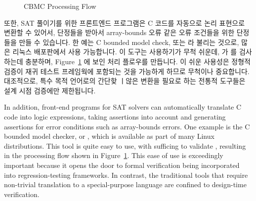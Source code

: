 \begin{figure}[tbp]
\centering
{}
\caption{CBMC Processing Flow}
\label{fig:formal:CBMC Processing Flow}
\end{figure}

또한, SAT 풀이기를 위한 프론트엔드 프로그램은 C 코드를 자동으로 논리 표현으로
변환할 수 있어서, 단정들을 받아서 array-bounds 오류 같은 오류 조건들을 위한
단정들을 만들 수 있습니다.
한 예는 C bounded model check, 또는  라 불리는 것으로, 많은 리눅스
배포판에서 사용 가능합니다.
이 도구는 사용하기가 무척 쉬운데,  가  를
검사하는데 충분하며, Figure~\ref{fig:formal:CBMC Processing Flow} 에 보인 처리
플로우를 만듭니다.
이 쉬운 사용성은 정형적 검증이 재귀 테스트 프레임웍에 포함되는 것을 가능하게
하므로 무척이나 중요합니다.
대조적으로, 특수 목적 언어로의 간단핮 ㅣ않은 변환을 필요로 하는 전통적 도구들은
설계 시점 검증에만 제한됩니다.

\iffalse

In addition, front-end programs for SAT solvers can automatically translate
C code into logic expressions, taking assertions into account and generating
assertions for error conditions such as array-bounds errors.
One example is the C bounded model checker, or , which is
available as part of many Linux distributions.
This tool is quite easy to use, with  sufficing to
validate , resulting in the processing flow shown in
Figure~\ref{fig:formal:CBMC Processing Flow}.
This ease of use is exceedingly important because it opens the door
to formal verification being incorporated into regression-testing
frameworks.
In contrast, the traditional tools that require non-trivial translation
to a special-purpose language are confined to design-time verification.

